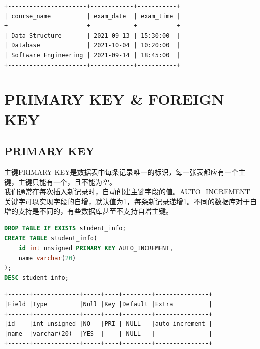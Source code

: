 \documentclass[12pt, openany, oneside]{book}
\begin{document}
\begin{tcolorbox}
	\begin{verbatim}
+----------------------+------------+-----------+
| course_name          | exam_date  | exam_time |
+----------------------+------------+-----------+
| Data Structure       | 2021-09-13 | 15:30:00  |
| Database             | 2021-10-04 | 10:20:00  |
| Software Engineering | 2021-09-14 | 18:45:00  |
+----------------------+------------+-----------+
	\end{verbatim}
\end{tcolorbox}

\newpage

\chapter{PRIMARY KEY \& FOREIGN KEY}

\section{PRIMARY KEY}

主键PRIMARY KEY是数据表中每条记录唯一的标识，每一张表都应有一个主键，主键只能有一个，且不能为空。\\

我们通常在每次插入新记录时，自动创建主键字段的值。AUTO\_INCREMENT关键字可以实现字段的自增，默认值为1，每条新记录递增1。不同的数据库对于自增的支持是不同的，有些数据库甚至不支持自增主键。\\


\begin{lstlisting}[language=SQL]
DROP TABLE IF EXISTS student_info;
CREATE TABLE student_info(
	id int unsigned PRIMARY KEY AUTO_INCREMENT,
	name varchar(20)
);
DESC student_info;
\end{lstlisting}

\begin{tcolorbox}
	\begin{verbatim}
+------+-------------+-----+----+--------+---------------+
|Field |Type         |Null |Key |Default |Extra          |
+------+-------------+-----+----+--------+---------------+
|id    |int unsigned |NO   |PRI | NULL   |auto_increment |
|name  |varchar(20)  |YES  |    | NULL   |               |
+------+-------------+-----+----+--------+---------------+
	\end{verbatim}
\end{tcolorbox}
\end{document}
